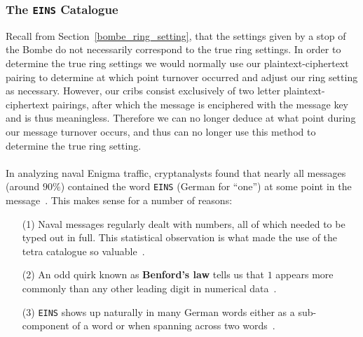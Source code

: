 \subsubsection{The \texttt{EINS} Catalogue}
Recall from Section~\ref{bombe_ring_setting}, that the settings
given by a stop of the Bombe do not necessarily correspond to the
true ring settings. In order to determine the true ring settings we
would normally use our plaintext-ciphertext pairing to determine at
which point turnover occurred and adjust our ring setting as
necessary. However, our cribs consist exclusively of two letter
plaintext-ciphertext pairings, after which the message is
enciphered with the message key and is thus meaningless. Therefore
we can no longer deduce at what point during our message turnover
occurs, and thus can no longer use this method to determine the true
ring setting.
\\\\In analyzing naval Enigma traffic, cryptanalysts found that
nearly all messages (around $90\%$) contained the word
\texttt{EINS} (German for ``one'') at some point in the message~\cite[pp.~140--142]{Turing1940ProfBook}.
This makes sense for a number of reasons:
\begin{enumerate}
  \item[(1)] Naval messages regularly dealt with numbers, all of which
    needed to be typed out in full. This statistical observation is
    what made the use of the tetra catalogue so valuable~\cite[Section 9.3]{Hosgood2007}.
  \item[(2)] An odd quirk known as {\bf{Benford's law}} tells us that
    $1$ appears more commonly than any other leading digit in numerical data~\cite[p.~556]{benford1938law}.
  \item[(3)] \texttt{EINS} shows up naturally in many German words
    either as a sub-component of a word or when spanning across two words~\cite[Section 9.3]{Hosgood2007}.
\end{enumerate}

